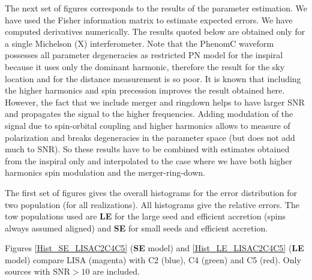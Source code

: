 \documentclass{iopart}
\begin{document}
The next set of figures corresponds to the results of the parameter estimation. We have used the Fisher information matrix 
to estimate expected errors. We have computed derivatives numerically. The results quoted below are obtained only for a single
Michelson (X) interferometer. Note that the PhenomC waveform possesses all parameter degeneracies as restricted PN 
model for the inspiral because it uses only the dominant harmonic, therefore the result for the sky location and for the 
distance measurement is so poor. It is known that including the higher harmonics and spin precession improves the 
result obtained here. However, the fact that we include merger and ringdown helps to have larger SNR  and  propagates the signal 
to the higher frequencies. Adding modulation of the signal due to spin-orbital coupling and higher harmonics allows 
to measure of polarization and breaks degeneracies in the parameter space (but does not add much to SNR). So these results 
have to be combined with estimates obtained from the inspiral only and interpolated to the case where we have both 
higher harmonics spin modulation and the merger-ring-down. 

The first set of figures gives the overall histograms for the error distribution for two population (for all realizations). 
All histograms give the relative errors. The tow populations used are {\bf LE} for the large seed and efficient accretion 
(spins always assumed aligned)  and {\bf SE} for small seeds and efficient accretion.

Figures \ref{Hist_SE_LISAC2C4C5} ({\bf SE} model)   and \ref{Hist_LE_LISAC2C4C5} ({\bf LE} model) compare LISA (magenta)
with C2 (blue), C4 (green) and C5 (red).  Only sources with SNR$>10$ are included. 

\end{document}
